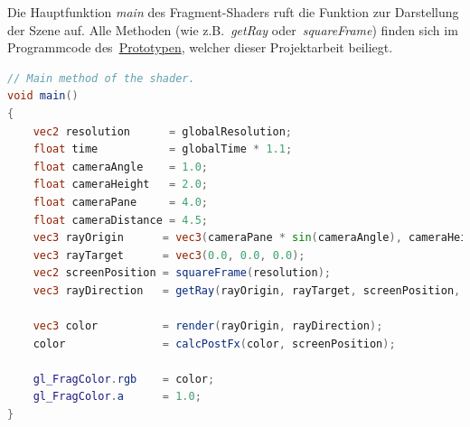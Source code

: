 Die Hauptfunktion \textit{main} des Fragment-Shaders ruft die Funktion
zur Darstellung der Szene auf. Alle Methoden (wie z.B.~\textit{getRay}
oder~\textit{squareFrame}) finden sich im Programmcode
des~\hyperref[chap:prototype]{Prototypen}, welcher dieser Projektarbeit
beiliegt.

\begin{minipage}{\linewidth}
\begin{lstlisting}[language=GLSL,caption={Einstiegspunkt des
        Fragment-Shaders.},
    label={alg:glsl_main},captionpos=b,emph={main}]
// Main method of the shader.
void main()
{
    vec2 resolution      = globalResolution;
    float time           = globalTime * 1.1;
    float cameraAngle    = 1.0;
    float cameraHeight   = 2.0;
    float cameraPane     = 4.0;
    float cameraDistance = 4.5;
    vec3 rayOrigin      = vec3(cameraPane * sin(cameraAngle), cameraHeight, cameraDistance * cos(cameraAngle * time));
    vec3 rayTarget      = vec3(0.0, 0.0, 0.0);
    vec2 screenPosition = squareFrame(resolution);
    vec3 rayDirection   = getRay(rayOrigin, rayTarget, screenPosition, 2.0);

    vec3 color          = render(rayOrigin, rayDirection);
    color               = calcPostFx(color, screenPosition);

    gl_FragColor.rgb    = color;
    gl_FragColor.a      = 1.0;
}
\end{lstlisting}
\end{minipage}
